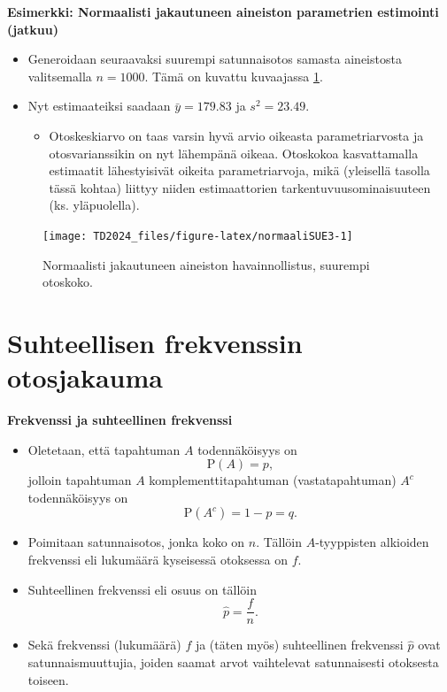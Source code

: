 \documentclass[
]{book}
\providecommand{\tightlist}{%
  \setlength{\itemsep}{0pt}\setlength{\parskip}{0pt}}
\begin{document}
\begin{eblock}{}

\textbf{Esimerkki: Normaalisti jakautuneen aineiston parametrien estimointi (jatkuu)}

\begin{itemize}
\tightlist
\item
  Generoidaan seuraavaksi suurempi satunnaisotos samasta aineistosta valitsemalla \(n=1000\). Tämä on kuvattu kuvaajassa \ref{fig:normaaliSUE3}.\\
\item
  Nyt estimaateiksi saadaan \(\bar{y} = 179.83\) ja \(s^2 = 23.49\).

  \begin{itemize}
  \tightlist
  \item
    Otoskeskiarvo on taas varsin hyvä arvio oikeasta parametriarvosta ja otosvarianssikin on nyt lähempänä oikeaa. Otoskokoa kasvattamalla estimaatit lähestyisivät oikeita parametriarvoja, mikä (yleisellä tasolla tässä kohtaa) liittyy niiden estimaattorien tarkentuvuusominaisuuteen (ks. yläpuolella).
  \end{itemize}
\end{itemize}

\end{eblock}

\begin{figure}

{\centering \texttt{[image: TD2024\_files/figure-latex/normaaliSUE3-1]} 

}

\caption{Normaalisti jakautuneen aineiston havainnollistus, suurempi otoskoko.}\label{fig:normaaliSUE3}
\end{figure}

\hfill\break

\hypertarget{alaluku85}{%
\section{Suhteellisen frekvenssin otosjakauma}\label{alaluku85}}

\textbf{Frekvenssi ja suhteellinen frekvenssi}

\begin{itemize}
\item
  Oletetaan, että tapahtuman \(A\) todennäköisyys on
  \[
  \text{P}(A) = p,
  \]
  jolloin tapahtuman \(A\) komplementtitapahtuman (vastatapahtuman) \(A^c\) todennäköisyys on
  \[
  \text{P}(A^c) = 1- p = q.
  \]
\item
  Poimitaan satunnaisotos, jonka koko on \(n\). Tällöin \(A\)-tyyppisten alkioiden frekvenssi eli lukumäärä kyseisessä otoksessa on \(f\).
\item
  Suhteellinen frekvenssi eli osuus on tällöin
  \[
  \widehat{p} = \frac{f}{n}.
  \]
\item
  Sekä frekvenssi (lukumäärä) \(f\) ja (täten myös) suhteellinen frekvenssi \(\widehat{p}\) ovat satunnaismuuttujia, joiden saamat arvot vaihtelevat satunnaisesti otoksesta toiseen.
\end{itemize}
\end{document}
